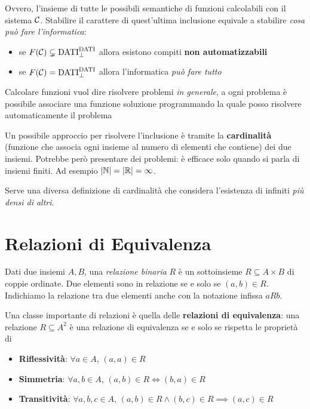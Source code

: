 Ovvero, l'insieme di tutte le possibili semantiche di funzioni calcolabili con il sistema $\mathcal{C}$. Stabilire il carattere di quest'ultima inclusione equivale a stabilire \textit{cosa può fare l'informatica}:
\begin{itemize}
	\item se $F(\mathcal{C}) \subsetneq \text{DATI}_\bot^{\text{DATI}}$ allora esistono compiti \textbf{non automatizzabili}
	
    \item se $F(\mathcal{C}) = \text{DATI}_\bot^{\text{DATI}}$ allora l'informatica \textit{può fare tutto}
\end{itemize}

Calcolare funzioni vuol dire risolvere problemi \textit{in generale}, a ogni problema è possibile associare una funzione soluzione programmando la quale posso risolvere automaticamente il problema

Un possibile approccio per risolvere l'inclusione è tramite la \textbf{cardinalità} (funzione che associa ogni insieme al numero di elementi che contiene) dei due insiemi. Potrebbe però presentare dei problemi: è efficace solo quando si parla di insiemi finiti. Ad esempio $|\mathbb{N}| = |\mathbb{R}| = \infty$.

Serve una diversa definizione di cardinalità che considera l'esistenza di infiniti \textit{più densi di altri}.

\section{Relazioni di Equivalenza}
Dati due insiemi $A,B$, una \textit{relazione binaria} $R$ è un sottoinsieme $R \subseteq A \times B$ di coppie ordinate. Due elementi sono in relazione se e solo se $(a,b) \in R$. Indichiamo la relazione tra due elementi anche con la notazione infissa $aRb$.

Una classe importante di relazioni è quella delle \textbf{relazioni di equivalenza}: una relazione $R \subseteq A^2$ è una relazione di equivalenza se e solo se rispetta le proprietà di
\begin{itemize}
	\item \textbf{Riflessività}: $\forall a \in A$, $(a,a) \in R$
	
    \item \textbf{Simmetria}: $\forall a,b \in A$, $(a,b) \in R \Leftrightarrow (b,a) \in R$
	
    \item \textbf{Transitività}: $\forall a,b,c \in A$, $(a,b) \in R \wedge (b,c) \in R \implies (a,c) \in R$
\end{itemize}

